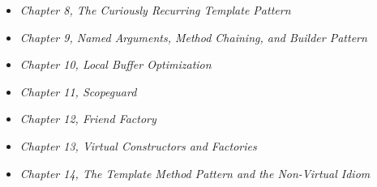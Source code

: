 
\begin{itemize}
\item
  \emph{Chapter 8, The Curiously Recurring Template Pattern}
\item
  \emph{Chapter 9, Named Arguments, Method Chaining, and Builder Pattern}
\item
  \emph{Chapter 10, Local Buffer Optimization}
\item
  \emph{Chapter 11, Scopeguard}
\item
  \emph{Chapter 12, Friend Factory}
\item
  \emph{Chapter 13, Virtual Constructors and Factories}
\item
  \emph{Chapter 14, The Template Method Pattern and the Non-Virtual Idiom}
\end{itemize}

